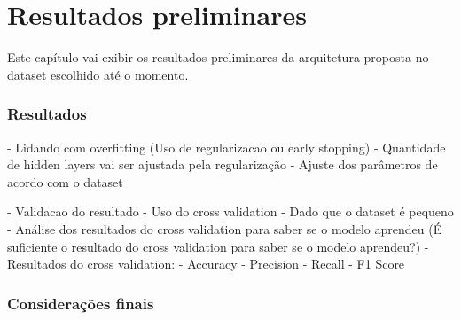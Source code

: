 \chapter{Resultados preliminares}
\label{cap:resultados-preliminares}

Este capítulo vai exibir os resultados preliminares da arquitetura proposta no dataset escolhido até o momento.



\subsection{Resultados}

 - Lidando com overfitting (Uso de regularizacao ou early stopping) - Quantidade de hidden layers vai ser ajustada pela regularização
         - Ajuste dos parâmetros de acordo com o dataset
      
          - Validacao do resultado 
             - Uso do cross validation - Dado que o dataset é pequeno
             - Análise dos resultados do cross validation para saber se o modelo aprendeu (É suficiente o resultado do cross validation para saber se o modelo aprendeu?)
              - Resultados do cross validation:
                  - Accuracy
                  - Precision
                  - Recall
                  - F1 Score
                  
  
\subsection{Considerações finais}


